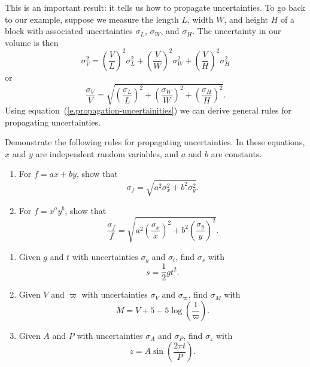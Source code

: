 This is an important result: it tells us how to propagate uncertainties.  To go back to our example, suppose we measure the length $L$, width $W$, and height $H$ of a block with associated uncertainties $\sigma_L$, $\sigma_W$, and $\sigma_H$.
The uncertainty in our volume is then\begin{equation}\label{e.uncertainty-volume}
	\sigma_{V}^{2} = \left(\frac{V}{L}\right)^{2}\sigma_{L}^{2}
		+ \left(\frac{V}{W}\right)^{2}\sigma_{W}^{2}
		+ \left(\frac{V}{H}\right)^{2}\sigma_{H}^{2}
\end{equation}
or
\[ \frac{\sigma_{V}}{V} = 
	\sqrt{\left(\frac{\sigma_{L}}{L}\right)^{2}
	+ \left(\frac{\sigma_{W}}{W}\right)^{2}
	+ \left(\frac{\sigma_{H}}{H}\right)^{2} }.
\]
Using equation~(\ref{e.propagation-uncertainities}) we can derive general rules for propagating uncertainties.

\begin{exercisebox}
Demonstrate the following rules for propagating uncertainties. In these equations, $x$ and $y$ are independent random variables, and $a$ and $b$ are constants.
\begin{enumerate}
\item For $f = ax + by$, show that 
\[ \sigma_{f} = \sqrt{ a^{2}\sigma_{x}^{2} + b^{2}\sigma_{y}^{2}}. \]
\item For $f = x^{a}y^{b}$, show that
\[ 
	\frac{\sigma_{f}}{f} = \sqrt{ a^{2}\left(\frac{\sigma_{x}}{x}\right)^{2} 
		+ b^{2}\left(\frac{\sigma_{y}}{y}\right)^{2} }.
\]
\end{enumerate}
\end{exercisebox}

\begin{exercisebox}
\begin{enumerate}
\item Given $g$ and $t$ with uncertainties $\sigma_{g}$ and $\sigma_{t}$, find $\sigma_{s}$ with
\[	s = \frac{1}{2}gt^{2}.	\]
\item Given $V$ and $\varpi$ with uncertainties $\sigma_{V}$ and $\sigma_{\varpi}$, find $\sigma_{M}$ with
\[	M = V + 5 - 5\log\left(\frac{1}{\varpi}\right).	\]
\item Given $A$ and $P$ with uncertainties $\sigma_{A}$ and $\sigma_{P}$, find $\sigma_{z}$ with
\[	z = A\sin\left(\frac{2\pi t}{P}\right).	\]
\end{enumerate}
\end{exercisebox}

